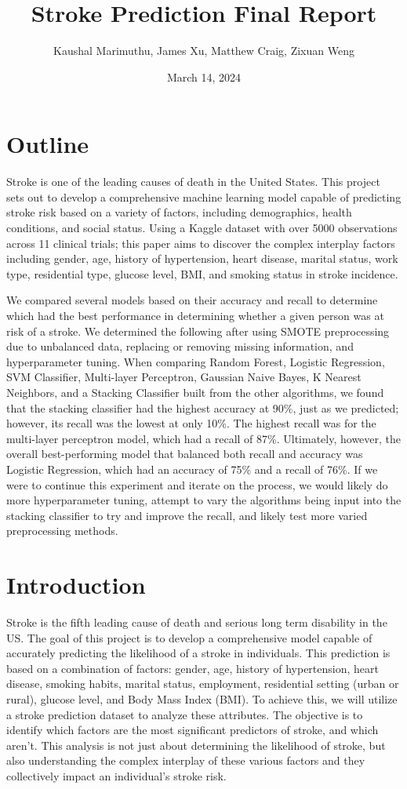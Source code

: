\documentclass[11pt]{article}
\title{Stroke Prediction Final Report}
\author{Kaushal Marimuthu, James Xu, Matthew Craig, Zixuan Weng}
\date{March 14, 2024}
\begin{document}
\maketitle

\section*{Outline}
Stroke is one of the leading causes of death in the United States. This project sets out to develop a comprehensive machine learning model capable of predicting stroke risk based on a variety of factors, including demographics, health conditions, and social status. Using a Kaggle dataset with over 5000 observations across 11 clinical trials; this paper aims to discover the complex interplay factors including gender, age, history of hypertension, heart disease, marital status, work type, residential type, glucose level, BMI, and smoking status in stroke incidence.  

\medskip 
We compared several models based on their accuracy and recall to determine which had the best performance in determining whether a given person was at risk of a stroke. We determined the following after using SMOTE preprocessing due to unbalanced data, replacing or removing missing information, and hyperparameter tuning. When comparing Random Forest, Logistic Regression, SVM Classifier, Multi-layer Perceptron, Gaussian Naive Bayes, K Nearest Neighbors, and a Stacking Classifier built from the other algorithms, we found that the stacking classifier had the highest accuracy at 90\%, just as we predicted; however, its recall was the lowest at only 10\%. The highest recall was for the multi-layer perceptron model, which had a recall of 87\%. Ultimately, however, the overall best-performing model that balanced both recall and accuracy was Logistic Regression, which had an accuracy of 75\% and a recall of 76\%. If we were to continue this experiment and iterate on the process, we would likely do more hyperparameter tuning, attempt to vary the algorithms being input into the stacking classifier to try and improve the recall, and likely test more varied preprocessing methods.

\section*{Introduction}
Stroke is the fifth leading cause of death and serious long term disability in the US. The goal of this project is to develop a comprehensive model capable of accurately predicting the likelihood of a stroke in individuals. This prediction is based on a combination of factors: gender, age, history of hypertension, heart disease, smoking habits, marital status, employment, residential setting (urban or rural), glucose level, and Body Mass Index (BMI). To achieve this, we will utilize a stroke prediction dataset to analyze these attributes. The objective is to identify which factors are the most significant predictors of stroke, and which aren’t. This analysis is not just about determining the likelihood of stroke, but also understanding the complex interplay of these various factors and they collectively impact an individual’s stroke risk.
\end{document}
